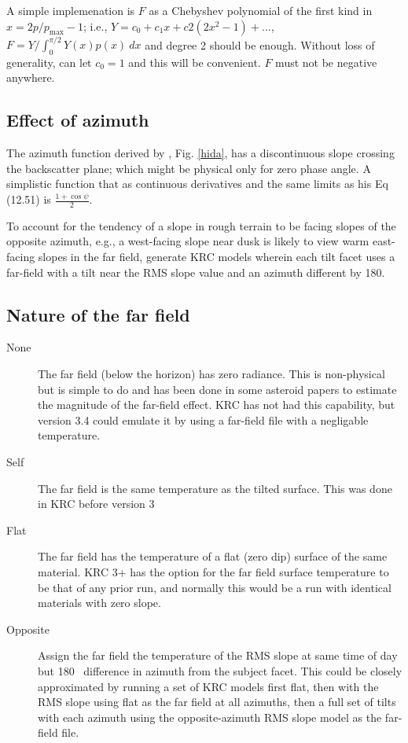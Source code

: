 \documentclass{article}
\begin{document}
A simple implemenation is $F$ as a Chebyshev polynomial of the first kind in
$x=2p/p_\mathrm{max} -1$; i.e., $Y=c_0+c_1x+c2(2x^2-1) + ...$, $F=
Y/\int_0^{\pi/2} Y(x)p(x)\ dx $ and degree 2 should be enough. Without loss of
generality, can let $c_0=1$ and this will be convenient.  $F$ must not be
negative anywhere.

\subsection{Effect of azimuth} %

The azimuth function derived by , Fig. \ref{hida}, has a
discontinuous slope crossing the backscatter plane; which might be physical only
for zero phase angle.  A simplistic function that as continuous derivatives and
the same limits as his Eq (12.51) is $\frac{1+ \cos \psi}{2}$.
 
 To account for the tendency of a slope in rough terrain to be facing slopes of
 the opposite azimuth, e.g., a west-facing slope near dusk is likely to view
 warm east-facing slopes in the far field, generate KRC models wherein each tilt
 facet uses a far-field with a tilt near the RMS slope value and an azimuth
 different by 180\qd.

\subsection{Nature of the far field} %
\begin{description}  %
\item [None] The far field (below the horizon) has zero radiance. This is
  non-physical but is simple to do and has been done in some asteroid papers to
  estimate the magnitude of the far-field effect. KRC has not had this
  capability, but version 3.4 could emulate it by using a far-field file with a
  negligable temperature.
  
\item [Self] The far field is the same temperature as the tilted surface. This
  was done in KRC before version 3

\item [Flat] The far field has the temperature of a flat (zero dip) surface of
  the same material. KRC 3+ has the option for the far field surface temperature
  to be that of any prior run, and normally this would be a run with identical
  materials with zero slope.

\item [Opposite] Assign the far field the temperature of the RMS slope at same
  time of day but 180\qd~ difference in azimuth from the subject facet. This
  could be closely approximated by running a set of KRC models first flat, then
  with the RMS slope using flat as the far field at all azimuths, then a full
  set of tilts with each azimuth using the opposite-azimuth RMS slope model as
  the far-field file.

\end{description}
\end{document}
